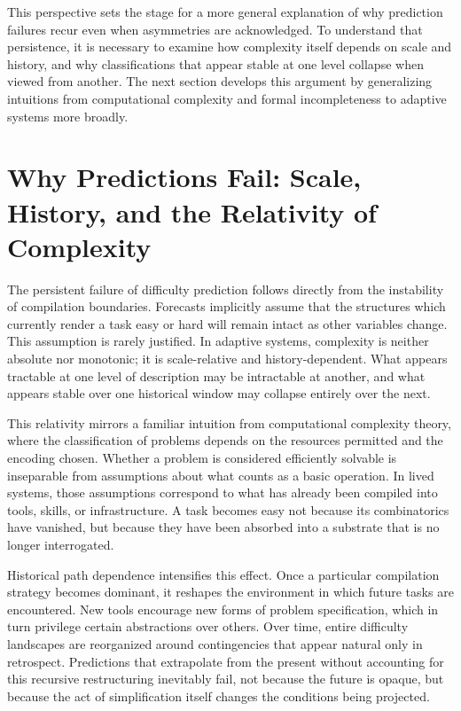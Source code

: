 \documentclass[12pt]{article}
\begin{document}
This perspective sets the stage for a more general explanation of why prediction failures recur even when asymmetries are acknowledged. To understand that persistence, it is necessary to examine how complexity itself depends on scale and history, and why classifications that appear stable at one level collapse when viewed from another. The next section develops this argument by generalizing intuitions from computational complexity and formal incompleteness to adaptive systems more broadly.

\section{Why Predictions Fail: Scale, History, and the Relativity of Complexity}

The persistent failure of difficulty prediction follows directly from the instability of compilation boundaries. Forecasts implicitly assume that the structures which currently render a task easy or hard will remain intact as other variables change. This assumption is rarely justified. In adaptive systems, complexity is neither absolute nor monotonic; it is scale-relative and history-dependent. What appears tractable at one level of description may be intractable at another, and what appears stable over one historical window may collapse entirely over the next.

This relativity mirrors a familiar intuition from computational complexity theory, where the classification of problems depends on the resources permitted and the encoding chosen. Whether a problem is considered efficiently solvable is inseparable from assumptions about what counts as a basic operation. In lived systems, those assumptions correspond to what has already been compiled into tools, skills, or infrastructure. A task becomes easy not because its combinatorics have vanished, but because they have been absorbed into a substrate that is no longer interrogated.

Historical path dependence intensifies this effect. Once a particular compilation strategy becomes dominant, it reshapes the environment in which future tasks are encountered. New tools encourage new forms of problem specification, which in turn privilege certain abstractions over others. Over time, entire difficulty landscapes are reorganized around contingencies that appear natural only in retrospect. Predictions that extrapolate from the present without accounting for this recursive restructuring inevitably fail, not because the future is opaque, but because the act of simplification itself changes the conditions being projected.
\end{document}

